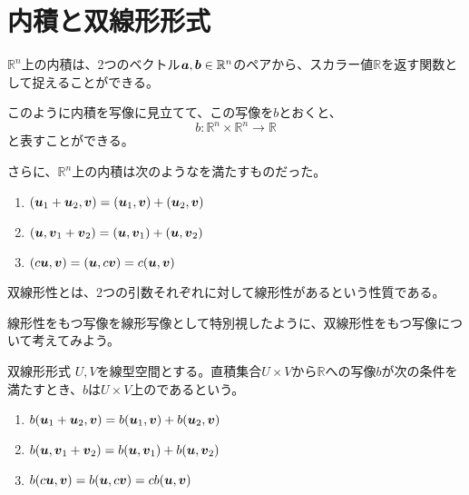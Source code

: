 \documentclass[../../../topic_linear-algebra]{subfiles}
\begin{document}
\sectionline
\section{内積と双線形形式}

$\mathbb{R}^n$上の内積は、2つのベクトル$\vb*{a}, \vb*{b} \in \mathbb{R}^n$のペアから、スカラー値$\mathbb{R}$を返す関数として捉えることができる。

このように内積を写像に見立てて、この写像を$b$とおくと、
\begin{equation*}
  b \colon \mathbb{R}^n \times \mathbb{R}^n \to \mathbb{R}
\end{equation*}
と表すことができる。

\br

さらに、$\mathbb{R}^n$上の内積は次のようなを満たすものだった。

\begin{enumerate}[label=\romanlabel]
  \item $(\vb*{u}_1 + \vb*{u}_2, \vb*{v}) = ( \vb*{u}_1, \vb*{v}) + ( \vb*{u}_2, \vb*{v})$
  \item $(\vb*{u}, \vb*{v}_1 + \vb*{v}_2) = (\vb*{u}, \vb*{v}_1) + (\vb*{u}, \vb*{v}_2)$
  \item $(c\vb*{u}, \vb*{v}) = (\vb*{u}, c\vb*{v}) = c(\vb*{u}, \vb*{v})$
\end{enumerate}

双線形性とは、2つの引数それぞれに対して線形性があるという性質である。

線形性をもつ写像を線形写像として特別視したように、双線形性をもつ写像について考えてみよう。

\begin{definition}{双線形形式}\label{def:bilinear-form}
  $U,V$を線型空間とする。直積集合$U \times V$から$\mathbb{R}$への写像$b$が次の条件を満たすとき、$b$は$U \times V$上のであるという。
  \begin{enumerate}[label=\romanlabel]
    \item $b(\vb*{u}_1 + \vb*{u}_2, \vb*{v}) = b(\vb*{u}_1, \vb*{v}) + b(\vb*{u}_2, \vb*{v})$
    \item $b(\vb*{u}, \vb*{v}_1 + \vb*{v}_2) = b(\vb*{u}, \vb*{v}_1) + b(\vb*{u}, \vb*{v}_2)$
    \item $b(c\vb*{u}, \vb*{v}) = b(\vb*{u}, c\vb*{v}) = cb(\vb*{u}, \vb*{v})$
  \end{enumerate}
\end{definition}
\end{document}

